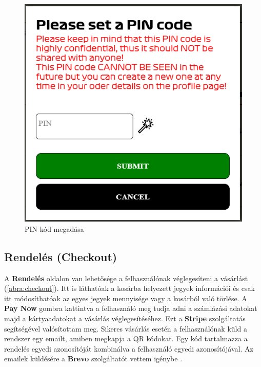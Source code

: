 \begin{figure}[!h]
	\centering
	\includegraphics[scale=0.4]{images/pinPopup}
	\caption{PIN kód megadása}
	\label{abra:pinPopup}
\end{figure}
\pagebreak

\subsection {Rendelés (Checkout)}

A \textbf{Rendelés} oldalon van lehetősége a felhasználónak véglegesíteni a vásárlást (\ref{abra:checkout}). Itt is láthatóak a kosárba helyezett jegyek információi és csak itt módosíthatóak az egyes jegyek mennyisége vagy a kosárból való törlése. A \textbf{Pay Now} gombra kattintva a felhasználó meg tudja adni a számlázási adatokat majd a kártyaadatokat a vásárlás véglegesítéséhez. Ezt a \textbf{Stripe} szolgáltatás segítségével valósítottam meg. Sikeres vásárlás esetén a felhasználónak küld a rendszer egy emailt, amiben megkapja a QR kódokat. Egy kód tartalmazza a rendelés egyedi azonosítóját kombinálva a felhasználó egyedi azonosítójával. Az emailek küldésére a \textbf{Brevo} szolgáltatót vettem igénybe \cite{Brevo}.

